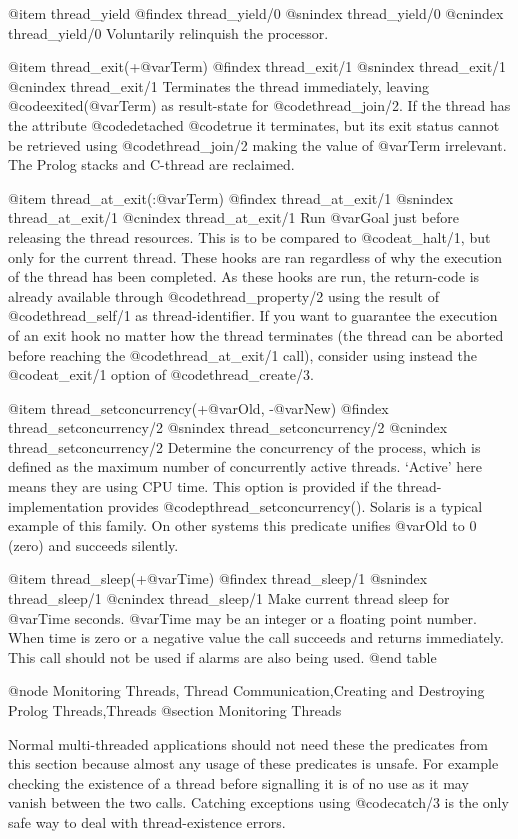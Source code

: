 {{{{{{{{@item thread_yield
@findex thread_yield/0
@snindex thread_yield/0
@cnindex thread_yield/0
Voluntarily relinquish the processor.

@item thread_exit(+@var{Term})
@findex thread_exit/1
@snindex thread_exit/1
@cnindex thread_exit/1
Terminates the thread immediately, leaving @code{exited(@var{Term})} as
result-state for @code{thread_join/2}.  If the thread has the attribute
@code{detached} @code{true} it terminates, but its exit status cannot be
retrieved using @code{thread_join/2} making the value of @var{Term}
irrelevant.  The Prolog stacks and C-thread are reclaimed.

@item thread_at_exit(:@var{Term})
@findex thread_at_exit/1
@snindex thread_at_exit/1
@cnindex thread_at_exit/1
Run @var{Goal} just before releasing the thread resources. This is to
be compared to @code{at_halt/1}, but only for the current
thread. These hooks are ran regardless of why the execution of the
thread has been completed. As these hooks are run, the return-code is
already available through @code{thread_property/2} using the result of
@code{thread_self/1} as thread-identifier. If you want to guarantee the 
execution of an exit hook no matter how the thread terminates (the thread 
can be aborted before reaching the @code{thread_at_exit/1} call), consider
using instead the @code{at_exit/1} option of @code{thread_create/3}. 

@item thread_setconcurrency(+@var{Old}, -@var{New})
@findex thread_setconcurrency/2
@snindex thread_setconcurrency/2
@cnindex thread_setconcurrency/2
Determine the concurrency of the process, which is defined as the
maximum number of concurrently active threads. `Active' here means
they are using CPU time. This option is provided if the
thread-implementation provides
@code{pthread_setconcurrency()}. Solaris is a typical example of this
family. On other systems this predicate unifies @var{Old} to 0 (zero)
and succeeds silently.

@item thread_sleep(+@var{Time})
@findex thread_sleep/1
@snindex thread_sleep/1
@cnindex thread_sleep/1
Make current thread sleep for @var{Time} seconds. @var{Time} may be an
integer or a floating point number. When time is zero or a negative value 
the call succeeds and returns immediately. This call should not be used if
alarms are also being used.
@end table


@node Monitoring Threads, Thread Communication,Creating and Destroying Prolog Threads,Threads
@section Monitoring Threads

Normal multi-threaded applications should not need these the predicates
from this section because almost any usage of these predicates is
unsafe. For example checking the existence of a thread before signalling
it is of no use as it may vanish between the two calls. Catching
exceptions using @code{catch/3} is the only safe way to deal with
thread-existence errors.

}}}}}}}}
